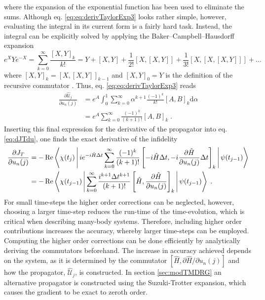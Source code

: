 where the expansion of the exponential function has been used to eliminate the sums. Although eq. \eqref{eq:eq:derivTaylorExp3} looks rather simple, however, evaluating the integral in its current form is a fairly hard task. Instead, the integral can be explicitly solved by applying the Baker–Campbell–Hausdorff expansion 
\begin{equation}
	e^X Y e^{-X} = \sum_{k = 0}^{\infty} \frac{ [ X,Y  ]_k }{k!} = Y + [ X,Y  ] + \frac{1}{2!} [ X , [ X,Y  ]] + \frac{1}{3!} [X, [ X , [ X,Y  ]]  ] + ...
\end{equation}
where $[ X , Y ]_k = [ X ,[ X , Y]]_{k-1}$ and $[X,Y]_0 = Y$ is the definition of the recursive commutator \cite{Wilcox1967}. Thus, eq. \eqref{eq:eq:derivTaylorExp3} reads
\begin{align}
	\frac{\partial \hat{\mathcal{U}}_{j}}{\partial u_n (j)} &=  e^A \int_{0}^{1} \sum_{k = 0}^{\infty } \alpha^{k+1} \frac{(-1)^k}{k!} [ A,B  ]_k \mathrm{d}\alpha \nonumber \\
	&= e^A  \sum_{k = 0}^{\infty }  \frac{(-1)^k}{(k+1)!} [ A,B  ]_k \; .
\end{align}
Inserting this final expression for the derivative of the propagator into eq. \eqref{eq:dJTdu}, one finds the exact derivative of the infidelity 
\begin{align}
\frac{\partial J_T}{\partial u_n (j)} &=  - \Re  \Braket{\chi (t_j) | i e^{-i \hat{H} \Delta t}  \sum_{k = 0}^{\infty }  \frac{(-1)^k}{(k+1)!} \left[ -i \hat{H} \Delta t , -i \frac{\partial \hat{H}}{\partial u_n (j)} \Delta t  \right]_k | \psi (t_{j-1})}  \nonumber \\
	&=  - \Re  \Braket{\chi (t_{j-1}) | \sum_{k = 0}^{\infty }  \frac{i^{k+1} \Delta t^{k+1}}{(k+1)!} \left[ \hat{H} , \frac{\partial \hat{H}}{\partial u_n (j)}  \right]_k | \psi (t_{j-1})}  \; . \label{eq:higherOrderGradient}
\end{align}
For small time-steps the higher order corrections can be neglected, however, choosing a larger time-step reduces the run-time of the time-evolution, which is critical when describing many-body systems. Therefore, including higher order contributions increases the accuracy, whereby larger time-steps can be employed. Computing the higher order corrections can be done efficiently by analytically deriving the commutators beforehand. The increase in accuracy achieved depends on the system, as it is determined by the commutator $[ \hat{H} , \partial \hat{H} / \partial u_n (j) ]$ and how the propagator, $\hat{\mathcal{U}}_{j}$, is constructed. In section \ref{sec:modTMDRG} an alternative propagator is constructed using the Suzuki-Trotter expansion, which causes the gradient to be exact to zeroth order.\\
